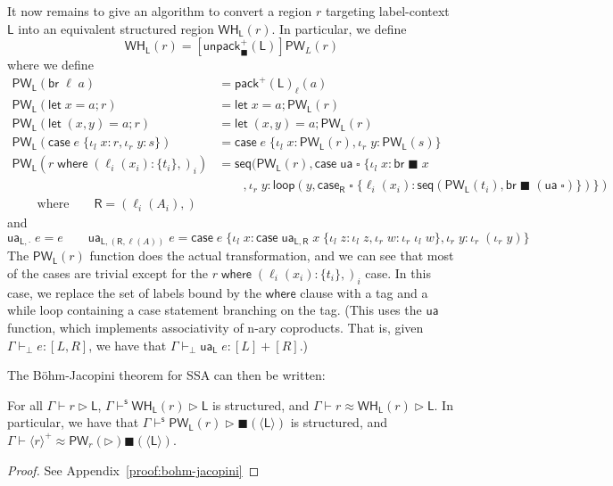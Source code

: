 \documentclass[acmsmall,screen,review]{acmart}
\newcommand{\ms}[1]{\ensuremath{\mathsf{#1}}}
\newcommand{\lto}{:}
\newcommand{\linl}[1]{\iota_l\;{#1}}
\newcommand{\linr}[1]{\iota_r\;{#1}}
\newcommand{\caseexpr}[5]{\ms{case}\;#1\;\{\linl{#2} \lto #3, \linr{#4} \lto #5\}}
\newcommand{\letstmt}[3]{\ensuremath{\ms{let}\;#1 = #2; #3}}
\newcommand{\brb}[2]{\ms{br}\;#1\;#2}
\newcommand{\casestmt}[5]{\ms{case}\;#1\;\{\linl{#2} \lto #3, \linr{#4} \lto #5\}}
\newcommand{\where}[2]{#1\;\ms{where}\;#2}
\newcommand{\wbranch}[3]{#1(#2) \lto \{#3\}}
\newcommand{\hasty}[4]{#1 \vdash_{#2} #3: {#4}}
\newcommand{\haslb}[3]{#1 \vdash #2 \rhd #3}
\newcommand{\shaslb}[3]{#1 \vdash^{\ms{s}} #2 \rhd #3}
\newcommand{\teqv}{\approx}
\newcommand{\lbeq}[4]{#1 \vdash #2 \teqv #3 \rhd {#4}}
\newcommand{\towhile}[2]{\ms{WH}_{#1}(#2)}
\newcommand{\topwhile}[2]{\ms{PW}_{#1}(#2)}
\newcommand{\invar}{\square}
\newcommand{\outlb}{\blacksquare}
\newcommand{\pckd}[1]{\langle #1 \rangle}
\begin{document}
It now remains to give an algorithm to convert a region $r$ targeting label-context $\ms{L}$ into an
equivalent structured region $\towhile{\ms{L}}{r}$. In particular, we define
\begin{equation}
  \towhile{\ms{L}}{r} = [\ms{unpack}^+_\outlb(\ms{L})]\topwhile{L}{r}
\end{equation}
where we define
\begin{equation}
  \begin{aligned}
    \topwhile{\ms{L}}{\ms{br}\;\ell\;a} &= \ms{pack}^+(\ms{L})_\ell(a) \\
    \topwhile{\ms{L}}{\letstmt{x}{a}{r}} &= \letstmt{x}{a}{\topwhile{\ms{L}}{r}} \\
    \topwhile{\ms{L}}{\letstmt{(x, y)}{a}{r}} &= \letstmt{(x, y)}{a}{\topwhile{\ms{L}}{r}} \\
    \topwhile{\ms{L}}{\casestmt{e}{x}{r}{y}{s}} 
      &= \casestmt{e}{x}{\topwhile{\ms{L}}{r}}{y}{\topwhile{\ms{L}}{s}} \\
    \topwhile{\ms{L}}{\where{r}{(\wbranch{\ell_i}{x_i}{t_i},)_i}} 
      &=
      \ms{seq}(\topwhile{\ms{L}}{r}, \caseexpr{\ms{ua}\;\invar}{x}{\brb{\outlb}{x}\\ & \qquad}{y}
        {\ms{loop}(y, 
        \ms{case}_{\ms{R}}\;\invar\;
          \{\ell_i(x_i) : \ms{seq}(\topwhile{\ms{L}}{t_i}, \brb{\outlb}{(\ms{ua}\;\invar)}\})})
      \\ \qquad \text{where} \qquad \ms{R} = (\ell_i(A_i),)
  \end{aligned}
\end{equation}
and
\begin{equation}
  \ms{ua}_{\ms{L}, \cdot}\;e = e \qquad
  \ms{ua}_{\ms{L}, (\ms{R}, \ell(A))}\;e 
    = \caseexpr{e}{x}{
        \caseexpr{\ms{ua}_{\ms{L}, \ms{R}}\;x}{z}{\iota_l\;z}{w}{\iota_r\;\iota_l\;w}}
        {y}{\iota_r\;(\iota_r\;y)}
\end{equation}
%
The $\topwhile{\ms{L}}{r}$ function does the actual transformation, and we can see that most of the
cases are trivial except for the $\where{r}{(\wbranch{\ell_i}{x_i}{t_i},)_i}$ case. In this case, we
replace the set of labels bound by the $\ms{where}$ clause with a tag and a while loop containing a
case statement branching on the tag. (This uses the $\ms{ua}$ function, which implements
associativity of n-ary coproducts. That is, given $\hasty{\Gamma}{\bot}{e}{[L, R]}$, we have that
$\hasty{\Gamma}{\bot}{\ms{ua}_{\ms{L}}\;e}{[L] + [R]}$.)

The B\"ohm-Jacopini theorem for SSA can then
be written:
\begin{theorem}[name=B\"ohm-Jacopini for SSA, restate=bohmjacopini]
  For all $\haslb{\Gamma}{r}{\ms{L}}$, $\shaslb{\Gamma}{\towhile{\ms{L}}{r}}{\ms{L}}$ is structured,
  and $\lbeq{\Gamma}{r}{\towhile{\ms{L}}{r}}{\ms{L}}$. In particular, we have that
  $\shaslb{\Gamma}{\topwhile{\ms{L}}{r}}{\outlb(\pckd{\ms{L}})}$ is structured, and
  $\lbeq{\Gamma}{\pckd{r}^+}{\topwhile{r}}{\outlb(\pckd{\ms{L}})}$.
\end{theorem}
\begin{proof}
  See Appendix~\ref{proof:bohm-jacopini}
\end{proof}
\end{document}
